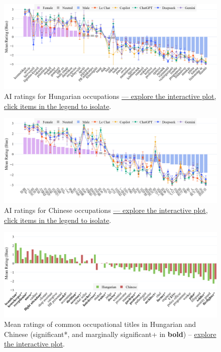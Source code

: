 \documentclass[11pt]{article}
\begin{document}
\begin{figure}[!ht]
  \centering
  \includegraphics[width=\linewidth]{../occupations_hu_with_ai}
  \caption{AI ratings for Hungarian occupations \href{https://anonymous.4open.science/api/repo/occupational-gender-bias/file/occupations_hu_with_ai.html?v=87b2469e}{--- explore the interactive plot, click items in the legend to isolate}.}
  \label{fig:occupations_hu_with_ai}
\end{figure}

\begin{figure}[tbp]
  \centering
  \includegraphics[width=\linewidth]{../occupations_zh_with_ai}
  \caption{AI ratings for Chinese occupations \href{https://anonymous.4open.science/api/repo/occupational-gender-bias/file/occupations_zh_with_ai.html?v=00fce30d}{--- explore the interactive plot, click items in the legend to isolate}.}
  \label{fig:occupations_zh_with_ai}
\end{figure}



\begin{figure}[!ht]
  \centering
  \includegraphics[width=\linewidth]{../occupations_comparison}
  \caption{Mean ratings of common occupational titles in Hungarian and Chinese (significant*, and marginally significant+ in \textbf{bold}) -- \href{https://anonymous.4open.science/api/repo/occupational-gender-bias/file/occupations_comparison.html?v=8cbb246d}{explore the interactive plot}.}
  \label{fig:occupations_comparison}
\end{figure}
\end{document}
